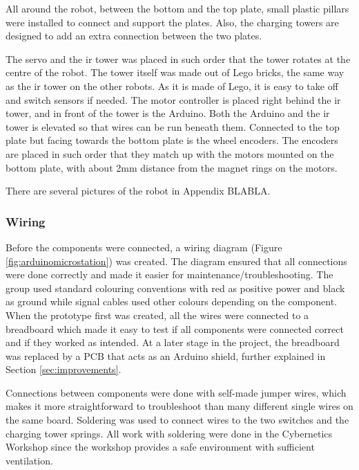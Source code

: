 All around the robot, between the bottom and the top plate, small plastic pillars were installed to connect and support the plates. Also, the charging towers are designed to add an extra connection between the two plates.

The servo and the \acrshort{ir} tower was placed in such order that the tower rotates at the centre of the robot. The tower itself was made out of Lego bricks, the same way as the \acrshort{ir} tower on the other robots. As it is made of Lego, it is easy to take off and switch sensors if needed. The motor controller is placed right behind the \acrshort{ir} tower, and in front of the tower is the Arduino. Both the Arduino and the \acrshort{ir} tower is elevated so that wires can be run beneath them. Connected to the top plate but facing towards the bottom plate is the wheel encoders.  The encoders are placed in such order that they match up with the motors mounted on the bottom plate, with about 2mm distance from the magnet rings on the motors.

There are several pictures of the robot in Appendix BLABLA.


\subsubsection{Wiring}
Before the components were connected, a wiring diagram (Figure \ref{fig:arduinomicrostation}) was created. The diagram ensured that all connections were done correctly and made it easier for maintenance/troubleshooting. The group used standard colouring conventions with red as positive power and black as ground while signal cables used other colours depending on the component. When the prototype first was created, all the wires were connected to a breadboard which made it easy to test if all components were connected correct and if they worked as intended. At a later stage in the project, the breadboard was replaced by a PCB that acts as an Arduino shield, further explained in Section \ref{sec:improvements}.

Connections between components were done with self-made jumper wires, which makes it more straightforward to troubleshoot than many different single wires on the same board. Soldering was used to connect wires to the two switches and the charging tower springs. All work with soldering were done in the Cybernetics Workshop since the workshop provides a safe environment with sufficient ventilation.